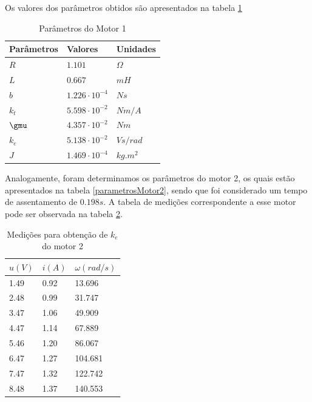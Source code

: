 \documentclass[]{politex}
\begin{document}
Os valores dos parâmetros obtidos são apresentados na tabela \ref{parametrosMotor}

\begin{table}[H] 
\centering
\caption{Parâmetros do Motor 1}
\label{parametrosMotor}
\begin{tabular}{l|l|l}
Parâmetros  & Valores               & Unidades   \\ \hline
$R$         & $1.101$               & $\Omega$   \\
$L$         & $0.667$               & $mH$       \\
$b$         & $1.226 \cdot 10^{-4}$ & $N s$      \\
$k_{t}$     & $5.598 \cdot 10^{-2}$ & $Nm/A$     \\
$\gmu$      & $4.357 \cdot 10^{-2}$ & $Nm$       \\
$k_{e}$     & $5.138 \cdot 10^{-2}$ & $V s/rad$  \\
$J$         & $1.469 \cdot 10^{-4}$ & $kg.m^{2}$
\end{tabular}
\end{table} 

Analogamente, foram determinamos os parâmetros do motor 2, os quais estão apresentados na tabela \ref{parametrosMotor2}, sendo que foi considerado um tempo de assentamento de $0.198 s$. A tabela de medições correspondente a esse motor pode ser observada na tabela \ref{MMQke2}.

\begin{table}[H]
\centering
\caption{Medições para obtenção de $k_{e}$ do motor 2}
\label{MMQke2}
\begin{tabular}{l|l|l}
$u(V)$     & $i(A)$    & $\omega(rad/s)$       \\ \hline
1.49  & 0.92 & 13.696  \\
2.48  & 0.99 & 31.747  \\
3.47  & 1.06 & 49.909  \\
4.47  & 1.14 & 67.889  \\
5.46  & 1.20 & 86.067  \\
6.47  & 1.27 & 104.681 \\
7.47  & 1.32 & 122.742 \\
8.48  & 1.37 & 140.553
\end{tabular}
\end{table}
\end{document}
